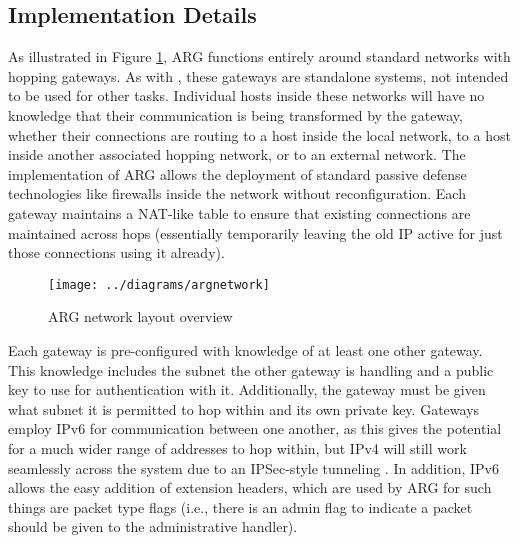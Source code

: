 \subsection{Implementation Details}

\par As illustrated in Figure \ref{fig:argnetwork}, ARG functions entirely around standard networks with hopping gateways. As with \cite{TAO}, these gateways are standalone systems, not intended to be used for other tasks. Individual hosts inside these networks will have no knowledge that their communication is being transformed by the gateway, whether their connections are routing to a host inside the local network, to a host inside another associated hopping network, or to an external network. The implementation of ARG allows the deployment of standard passive defense technologies like firewalls inside the network without reconfiguration. Each gateway maintains a NAT-like table to ensure that existing connections are maintained across hops (essentially temporarily leaving the old IP active for just those connections using it already).

\begin{figure}
	\centering
	\texttt{[image: ../diagrams/argnetwork]}
	\caption{ARG network layout overview}
	\label{fig:argnetwork}
\end{figure}

\par Each gateway is pre-configured with knowledge of at least one other gateway. This knowledge includes the subnet the other gateway is handling and a public key to use for authentication with it. Additionally, the gateway must be given what subnet it is permitted to hop within and its own private key. Gateways employ IPv6 for communication between one another, as this gives the potential for a much wider range of addresses to hop within, but IPv4 will still work seamlessly across the system due to an IPSec-style tunneling \cite{rfc4301}. In addition, IPv6 allows the easy addition of extension headers, which are used by ARG for such things are packet type flags (i.e., there is an admin flag to indicate a packet should be given to the administrative handler).

